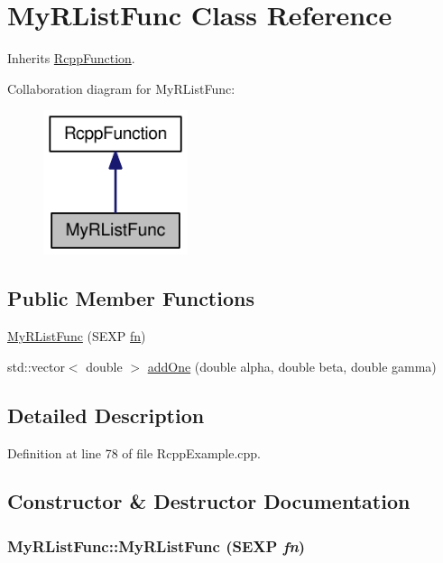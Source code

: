 \hypertarget{classMyRListFunc}{
\section{MyRListFunc Class Reference}
\label{classMyRListFunc}
}
Inherits \hyperlink{classRcppFunction}{RcppFunction}.

Collaboration diagram for MyRListFunc:\nopagebreak
\begin{figure}[H]
\begin{center}
\leavevmode
\includegraphics[width=120pt]{classMyRListFunc__coll__graph}
\end{center}
\end{figure}
\subsection*{Public Member Functions}
\begin{CompactItemize}
\item 
\hyperlink{classMyRListFunc_7ab78b186d110497a404f88009455af6}{MyRListFunc} (SEXP \hyperlink{classRcppFunction_a6b5966224b8b7d158be6cdfc3612063}{fn})
\item 
std::vector$<$ double $>$ \hyperlink{classMyRListFunc_0dec3b59e1e235c0502594a5d92cae13}{addOne} (double alpha, double beta, double gamma)
\end{CompactItemize}


\subsection{Detailed Description}


Definition at line 78 of file RcppExample.cpp.

\subsection{Constructor \& Destructor Documentation}
\hypertarget{classMyRListFunc_7ab78b186d110497a404f88009455af6}{
\subsubsection[{MyRListFunc}]{\setlength{\rightskip}{0pt plus 5cm}MyRListFunc::MyRListFunc (SEXP {\em fn})}}
\label{classMyRListFunc_7ab78b186d110497a404f88009455af6}




